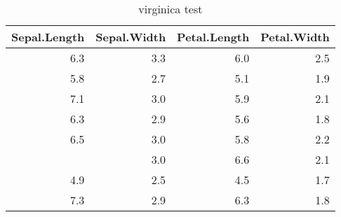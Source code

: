\documentclass[10pt,]{article}
\begin{document}
\clearpage
\begin{table}

\caption{\label{tab:unnamed-chunk-1}virginica test}
\centering
\begin{tabular}[t]{rrrr}
\toprule
Sepal.Length & Sepal.Width & Petal.Length & Petal.Width\\
\midrule
6.3 & 3.3 & 6.0 & 2.5\\
5.8 & 2.7 & 5.1 & 1.9\\
7.1 & 3.0 & 5.9 & 2.1\\
6.3 & 2.9 & 5.6 & 1.8\\
6.5 & 3.0 & 5.8 & 2.2\\
\addlinespace
7.6 & 3.0 & 6.6 & 2.1\\
4.9 & 2.5 & 4.5 & 1.7\\
7.3 & 2.9 & 6.3 & 1.8\\
\bottomrule
\end{tabular}
\end{table}
\end{document}
